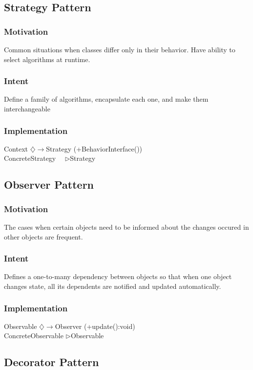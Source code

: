 \documentclass[a4paper]{scrartcl}
\newcommand{\aggregates}{$\diamondsuit\rightarrow $}
\newcommand{\implements}{\textendash ~\textendash ~\textendash$\triangleright$}
\newcommand{\extends}{\textendash\textendash\textendash$\triangleright$}
\begin{document}
    \subsection { Strategy Pattern }
      \subsubsection {Motivation}
        Common situations when classes differ only in their behavior. Have ability to select algorithms at runtime.
      \subsubsection {Intent}
        Define a family of algorithms, encapsulate each one, and make them interchangeable
      \subsubsection { Implementation }
        Context \aggregates Strategy (+BehaviorInterface())\\
        ConcreteStrategy \implements Strategy\\
        
        
    \subsection{Observer Pattern}
      \subsubsection{Motivation}
        The cases when certain objects need to be informed about the changes occured in other objects are frequent.
      \subsubsection{Intent}
        Defines a one-to-many dependency between objects so that when one object changes state, all its dependents are notified and updated automatically.
      \subsubsection{Implementation}
        Observable \aggregates Observer (+update():void)\\
        ConcreteObservable \extends Observable\\
        
        
    \subsection { Decorator Pattern }
\end{document}
